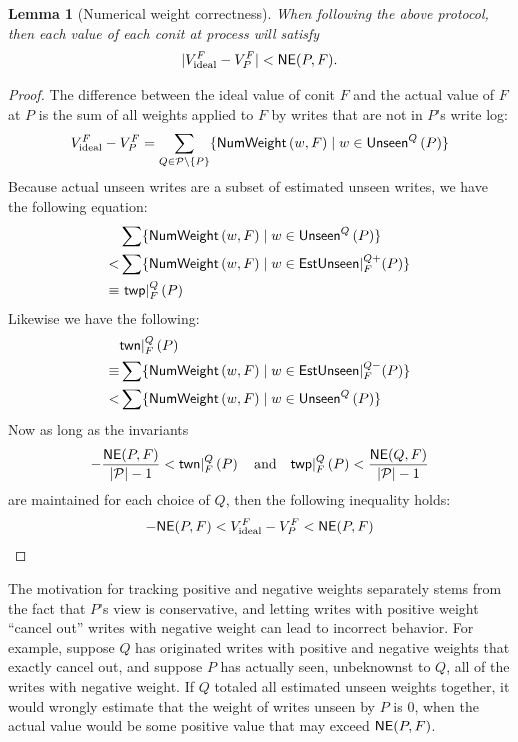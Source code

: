 \documentclass[]             %
{NASA}                       %
\newtheorem{lemma}[theorem]{Lemma}
\theoremstyle{definition}
\begin{document}
\begin{lemma}[Numerical weight correctness]
  When following the above protocol, then each value of each conit at process will satisfy
  \[ | \Videal{F} - \conitAt{F}{P} | < \NE{(P, F)}. \]
\end{lemma}
\begin{proof}
  The difference between the ideal value of conit $F$ and the actual
  value of $F$ at $P$ is the sum of all weights applied to $F$ by
  writes that are not in $P$'s write log:
  \begin{equation*}
    \Videal{F} - \conitAt{F}{P} =  \sum_{Q \in \AllProc \setminus \{P\}} \{ \NumWeight\left(w, F\right) \mid w \in \Unseen^Q\left(P\right) \}
  \end{equation*}
  Because actual unseen writes are a subset of estimated unseen writes, we have the following equation:
  \begin{align*}
    & \sum \{ \NumWeight\left(w, F\right) \mid w \in \Unseen^Q\left(P\right) \} \\
    < & \sum \{ \NumWeight\left(w, F\right) \mid w \in \EstUnseenPos{Q}{F}{P} \}\\
    \equiv & \ \twp{Q}{F}{P}
  \end{align*}
  Likewise we have the following:
  \begin{align*}
    &  \twn{Q}{F}{P} \\
    \equiv & \sum \{ \NumWeight\left(w, F\right) \mid w \in \EstUnseenNeg{Q}{F}{P} \}\\
    < & \sum \{ \NumWeight\left(w, F\right) \mid w \in \Unseen^Q\left(P\right) \}
  \end{align*}
  Now as long as the invariants
  \begin{equation*}
    -\frac{\NE(P, F)}{|\AllProc|-1} < \twn{Q}{F}{P} \textrm{\quad{}and\quad}
    \twp{Q}{F}{P} < \frac{\NE(Q, F)}{|\AllProc|-1}
  \end{equation*} are maintained for each choice of $Q$, then the following inequality holds:
  \begin{equation*}
    - \NE{(P, F)} < \Videal{F} - \conitAt{F}{P} < \NE{(P, F)}
  \end{equation*}
\end{proof}

The motivation for tracking positive and negative weights separately
stems from the fact that $P$'s view is conservative, and letting
writes with positive weight ``cancel out'' writes with negative weight
can lead to incorrect behavior. For example, suppose $Q$ has
originated writes with positive and negative weights that exactly
cancel out, and suppose $P$ has actually seen, unbeknownst to $Q$, all
of the writes with negative weight. If $Q$ totaled all estimated
unseen weights together, it would wrongly estimate that the weight of
writes unseen by $P$ is $0$, when the actual value would be some
positive value that may exceed $\NE{(P, F)}$.
\end{document}
